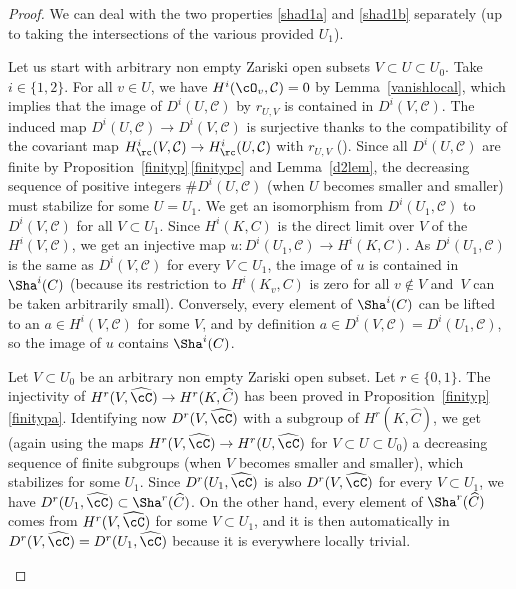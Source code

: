 \begin{proof} We can deal with the two properties \eqref{shad1a} and \eqref{shad1b} separately
(up to taking the intersections of the various provided $U_1$).

\begin{enumeratea}
\item
Let us start with arbitrary non empty Zariski open subsets
$V \subset U \subset U_0$. Take $i \in \{1,2\}$.
For all $v \in U$, we have $H^i(\cO_v,\mathcal C)=0$ by
Lemma~\ref{vanishlocal}, which implies that
the image of $D^i(U,\mathcal C)$ by $r_{U,V}$ is contained in
$D^i(V,\mathcal C)$. The induced map $D^i(U,\mathcal C) \to
D^i(V,\mathcal C)$ is surjective thanks to the compatibility of
the covariant map $H^i_\rc(V,\mathcal C) \to H^i_\rc(U,\mathcal C)$
with $r_{U,V}$ (\cite[Prop.\,2.1\,(3)]{DemH}). Since all $D^i(U,\mathcal C)$
are finite by Proposition~\ref{finityp}\,\eqref{finitypc} and Lemma~\ref{d2lem},
the decreasing sequence
of positive integers $\# D^i(U,\mathcal C)$ (when $U$ becomes
smaller and smaller) must stabilize for some $U=U_1$. We get
an isomorphism from $D^i(U_1,\mathcal C)$ to $D^i(V,\mathcal C)$
for all $V \subset U_1$. Since
$H^i(K,C)$ is the direct limit over $V$ of the $H^i(V,\mathcal C)$, we
get an injective map \hbox{$u: D^i(U_1,\mathcal C) \to H^i(K,C)$}. As
$D^i(U_1,\mathcal C)$ is the same as $D^i(V,\mathcal C)$ for every
$V \subset U_1$, the image of $u$ is contained in $\Sha^i(C)$ (because
its restriction to $H^i(K_v,C)$ is zero for all $v \not \in V$ and~$V$ can be taken arbitrarily small). Conversely, every element
of $\Sha^i(C)$ can be lifted to an $a\!\in\!H^i(V, \mathcal C)$ for some
$V$, and by definition \hbox{$a\!\in\!D^i(V,\mathcal C)\!=\!D^i(U_1,\mathcal C)$}, so
the image of $u$ contains $\Sha^i(C)$.

\item
Let $V \subset U_0$ be an arbitrary non empty Zariski
open subset. Let $r \in \{0, 1\}$.
The injectivity
of $H^r(V, \widehat \cC) \to H^r(K,\widehat C)$ has been
proved in Proposition~\ref{finityp}\,\eqref{finitypa}.
Identifying
now $D^r(V,\widehat \cC)$ with a subgroup of
$H^r(K,\widehat C)$, we get (again using the maps
$H^r(V,\widehat \cC) \to H^r(U,\widehat \cC)$ for
$V \subset U \subset U_0$) a decreasing sequence of
finite subgroups (when $V$ becomes smaller and smaller), which
stabilizes for some $U_1$. Since $D^r(U_1,\widehat \cC)$ is
also $D^r(V,\widehat \cC)$ for every $V \subset U_1$, we
have $D^r(U_1,\widehat \cC) \subset \Sha^r(\widehat C)$.
On the other hand, every element of $\Sha^r(\widehat C)$ comes from
$H^r(V,\widehat \cC)$ for some $V \subset U_1$, and it is then
automatically in $D^r(V,\widehat \cC)=D^r(U_1,\widehat \cC)$
because it is everywhere locally trivial.\qedhere
\end{enumeratea}
\end{proof}

